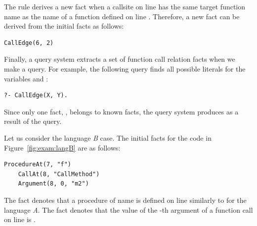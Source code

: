 
\noindent
The rule derives a new fact  when a callsite on line
 has the same target function name as the name of a function defined
on line . Therefore, a new fact can be derived from the initial facts
as follows: 

\begin{lstlisting}[style=mrule]
    CallEdge(6, 2)
\end{lstlisting}

Finally, a query system extracts a set of function call relation facts when we
make a query. 
For example, the following query finds all possible literals for the variables
 and :

\begin{lstlisting}[style=mrule]
    ?- CallEdge(X, Y).
\end{lstlisting}
\noindent
Since only one  fact, , belongs to known
facts, the query system produces  as a result
of the query.


Let us consider the language {\it B} case.
The initial facts for the code in Figure~\ref{fig:exam:langB} are as follows: 

\begin{lstlisting}[style=mrule]
    ProcedureAt(7, "f")
    CallAt(8, "CallMethod")
    Argument(8, 0, "m2")
\end{lstlisting}

\noindent
The fact  denotes that a procedure of name
 is defined on line  similarly to
 for the language {\it A}.
The fact  denotes that the value of
the -th argument of a function call on line  is .

